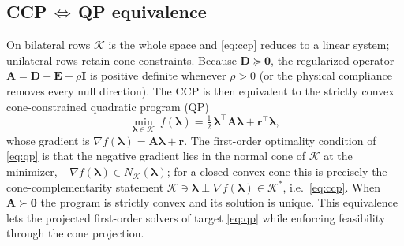 \documentclass{article}
\newcommand{\Del}{\mathbf{D}}         %
\newcommand{\Ecomp}{\mathbf{E}}       %
\newcommand{\Aop}{\mathbf{A}}         %
\newcommand{\blam}{\boldsymbol{\lambda}}
\newcommand{\rhs}{\mathbf{r}}
\newcommand{\Kadm}{\mathcal{K}}          %
\newcommand{\reg}{\rho}                  %
\newcommand{\Id}{\mathbf{I}}
\theoremstyle{plain}
\theoremstyle{definition}
\begin{document}
\subsection{\texorpdfstring{CCP\,$\Leftrightarrow$\,QP}{CCP--QP} equivalence}
\label{sec:ccp_qp}
On bilateral rows $\Kadm$ is the whole space and \eqref{eq:ccp} reduces to a
linear system; unilateral rows retain cone constraints. Because
$\Del\succeq\mathbf0$, the regularized operator
$\Aop=\Del+\Ecomp+\reg\Id$ is positive definite whenever $\reg>0$ (or the
physical compliance removes every null direction). The CCP is then equivalent
to the strictly convex cone-constrained quadratic program (QP)
\begin{equation}
\min_{\blam\in\Kadm}\ f(\blam)
=\tfrac12\,\blam^{\top}\Aop\blam + \rhs^{\top}\blam ,
\label{eq:qp}
\end{equation}
whose gradient is $\nabla f(\blam)=\Aop\blam+\rhs$. The
first-order optimality condition of \eqref{eq:qp} is that the negative gradient
lies in the normal cone of $\Kadm$ at the minimizer,
$-\nabla f(\blam)\in N_{\Kadm}(\blam)$; for a closed convex cone this is precisely
the cone-complementarity statement
$\Kadm\ni\blam\perp\nabla f(\blam)\in\Kadm^{*}$, i.e.\ \eqref{eq:ccp}. When
$\Aop\succ\mathbf 0$ the program is strictly convex and its solution is unique.
This equivalence lets the projected first-order solvers of
 target \eqref{eq:qp} while enforcing feasibility through the
cone projection.
\end{document}
